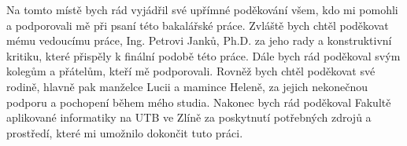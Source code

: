 \documentclass[a4paper,12pt]{article}
\begin{document}
\titulnistrana

\zadani

\prohlaseni

\abstraktaklicovaslova


\clearpage
\thispagestyle{empty}
Na tomto místě bych rád vyjádřil své upřímné poděkování všem, kdo mi pomohli a podporovali mě při psaní této bakalářské práce. Zvláště bych chtěl poděkovat mému vedoucímu práce, Ing. Petrovi Janků, Ph.D. za jeho rady a konstruktivní kritiku, které přispěly k finální podobě této práce. Dále bych rád poděkoval svým kolegům a přátelům, kteří mě podporovali. Rovněž bych chtěl poděkovat své rodině, hlavně pak manželce Lucii a mamince Heleně, za jejich nekonečnou podporu a pochopení během mého studia. Nakonec bych rád poděkoval Fakultě aplikované informatiky na UTB ve Zlíně za poskytnutí potřebných zdrojů a prostředí, které mi umožnilo dokončit tuto práci.


\obsah  %


\OdsazovaniOdstavcuStart %


\OdsazovaniOdstavcuStop


\seznamlitbib




\seznamobr  %


\seznamtab  %




\end{document}

